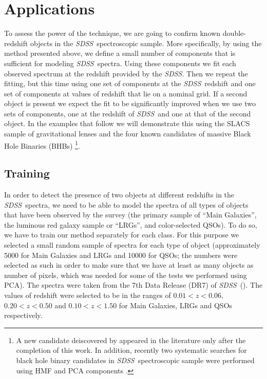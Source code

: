 \documentclass[12pt,preprint]{aastex}
\newcommand{\project}[1]{\textsl{#1}}
\newcommand{\sdss}{\project{SDSS}}
\newcommand{\SDSS}{\sdss}
\begin{document}
\section{Applications}\label{sec:applications}
To assess the power of the technique, we are going to confirm known
double-redshift objects in the \SDSS\ spectroscopic sample. More
specifically, by using the method presented above, we define a small
number of components that is sufficient for modeling \SDSS\ 
spectra. Using these components we fit each observed spectrum at the
redshift provided by the \SDSS. Then we repeat the fitting, but this time
using one set of components at the \SDSS\ redshift and one set of
components at values of redshift that lie on a nominal grid. If a
second object is present we expect the fit to be significantly improved when we use
two sets of components, one at the redshift of \SDSS\ and one at that of
the second object. In the examples that follow we will demonstrate
this using the SLACS sample of gravitational lenses \citep{bolton} and
the four known candidates of massive Black Hole Binaries (BHBs)
\citep{komossa,bogdanovic09,dotti09,boroson,shields,decarli}
\footnote{A new candidate deiscovered by \cite{barrows11} appeared in the literature 
only after the completion of this work. In addition, recently two systematic searches 
for black hole binary candidates in \SDSS\ spectroscopic sample were performed using HMF 
\citep{tsalmantza} and PCA components \citep{eracleous}.}.

\subsection{Training}\label{sec:training}
In order to detect the presence of two objects at different redshifts
in the \SDSS\ spectra, we need to be able to model the spectra of all
types of objects that have been observed by the survey (the primary
sample of ``Main Galaxies'', the luminous red galaxy sample or
``LRGs'', and color-selected QSOs). To do so, we have to train our
method separately for each class. For this purpose we selected a small
random sample of spectra for each type of object (approximately 5000
for Main Galaxies and LRGs and 10000 for QSOs; the numbers were
selected as such in order to make sure that we have at least as many
objects as number of pixels, which was needed for some of the tests we
performed using PCA). The spectra were taken from the 7th Data Release
(DR7) of \SDSS\ (\citealt{sdssdr7}). The values of redshift were selected to
be in the ranges of $0.01<z<0.06$, $0.20<z<0.50$ and $0.10<z<1.50$ for
Main Galaxies, LRGs and QSOs respectively.
\end{document}
